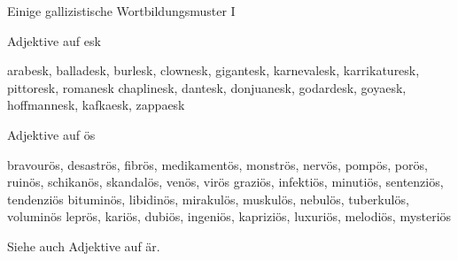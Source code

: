 \begin{frame}
  {Einige gallizistische Wortbildungsmuster I}
  \onslide<+->
  \onslide<+->
  \begin{exe}
    \ex \alert{Adjektive auf esk}
    \begin{xlist}
      \ex \small arabesk, balladesk, burlesk, clownesk, gigantesk, karnevalesk, karrikaturesk, pittoresk, romanesk
      \ex \small chaplinesk, dantesk, donjuanesk, godardesk, goyaesk, hoffmannesk, kafkaesk, zappaesk
    \end{xlist}
    \onslide<+->
    \ex \alert{Adjektive auf ös}
    \begin{xlist}
      \ex \small bravourös, desaströs, fibrös, medikamentös, monströs, nervös, pompös, porös, ruinös, schikanös, skandalös, venös, virös
      \ex \small graziös, infektiös, minutiös, sentenziös, tendenziös
      \ex \small bituminös, libidinös, mirakulös, muskulös, nebulös, tuberkulös, voluminös
      \ex \small leprös, kariös, dubiös, ingeniös, kapriziös, luxuriös, melodiös, mysteriös
    \end{xlist}
  \end{exe}
  \onslide<+->
  \Viertelzeile
  Siehe auch Adjektive auf \alert{är}.
\end{frame}


